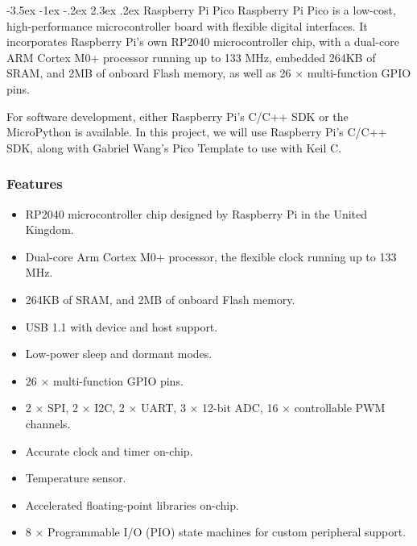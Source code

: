 \documentclass[13pt,a4paper,twoside]{report}
\makeatletter
\renewcommand\section{\@startsection {section}{1}{-1em}%
  {-3.5ex \@plus -1ex \@minus -.2ex}%
  {2.3ex \@plus.2ex}%
  {\normalfont\Large\bfseries}}
\makeatother
\begin{document}
\section{Raspberry Pi Pico}
Raspberry Pi Pico is a low-cost, high-performance microcontroller board with flexible digital interfaces. It incorporates Raspberry Pi's own RP2040 microcontroller chip, with a dual-core ARM Cortex M0+ processor running up to 133 MHz, embedded 264KB of SRAM, and 2MB of onboard Flash memory, as well as 26 × multi-function GPIO pins.

For software development, either Raspberry Pi's C/C++ SDK or the MicroPython is available. In this project, we will use Raspberry Pi's C/C++ SDK, along with Gabriel Wang's Pico Template to use with Keil C.

\subsubsection{Features}
\begin{itemize}
\item RP2040 microcontroller chip designed by Raspberry Pi in the United Kingdom.
\item Dual-core Arm Cortex M0+ processor, the flexible clock running up to 133 MHz.
\item 264KB of SRAM, and 2MB of onboard Flash memory.
\item USB 1.1 with device and host support.
\item Low-power sleep and dormant modes.
\item 26 × multi-function GPIO pins.
\item 2 × SPI, 2 × I2C, 2 × UART, 3 × 12-bit ADC, 16 × controllable PWM channels.
\item Accurate clock and timer on-chip.
\item Temperature sensor.
\item Accelerated floating-point libraries on-chip.
\item 8 × Programmable I/O (PIO) state machines for custom peripheral support.
\end{itemize}
\end{document}
